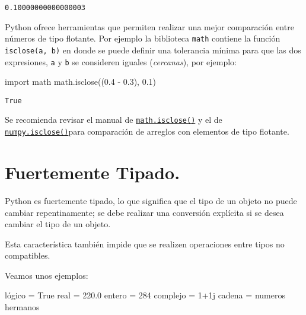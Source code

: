 \documentclass[
  letterpaper,
  DIV=11,
  numbers=noendperiod]{scrreprt}
\newenvironment{Shaded}{\begin{snugshade}}{\end{snugshade}}
\newcommand{\DecValTok}[1]{\textcolor[rgb]{0.68,0.00,0.00}{#1}}
\newcommand{\FloatTok}[1]{\textcolor[rgb]{0.68,0.00,0.00}{#1}}
\newcommand{\ImportTok}[1]{\textcolor[rgb]{0.00,0.46,0.62}{#1}}
\newcommand{\NormalTok}[1]{\textcolor[rgb]{0.00,0.23,0.31}{#1}}
\newcommand{\OperatorTok}[1]{\textcolor[rgb]{0.37,0.37,0.37}{#1}}
\newcommand{\OtherTok}[1]{\textcolor[rgb]{0.00,0.23,0.31}{#1}}
\newcommand{\StringTok}[1]{\textcolor[rgb]{0.13,0.47,0.30}{#1}}
\newcommand{\VariableTok}[1]{\textcolor[rgb]{0.07,0.07,0.07}{#1}}
\begin{document}
\begin{verbatim}
0.10000000000000003
\end{verbatim}

Python ofrece herramientas que permiten realizar una mejor comparación
entre números de tipo flotante. Por ejemplo la biblioteca \texttt{math}
contiene la función \texttt{isclose(a,\ b)} en donde se puede definir
una tolerancia mínima para que las dos expresiones, \texttt{a} y
\texttt{b} se consideren iguales (\emph{cercanas}), por ejemplo:

\begin{Shaded}
\begin{Highlighting}[]
\ImportTok{import}\NormalTok{ math}
\NormalTok{math.isclose((}\FloatTok{0.4} \OperatorTok{{-}} \FloatTok{0.3}\NormalTok{), }\FloatTok{0.1}\NormalTok{)}
\end{Highlighting}
\end{Shaded}

\begin{verbatim}
True
\end{verbatim}

Se recomienda revisar el manual de
\href{https://docs.python.org/3/library/math.html}{\texttt{math.isclose()}}
y el de
\href{https://numpy.org/doc/stable/reference/generated/numpy.isclose.html}{\texttt{numpy.isclose()}}para
comparación de arreglos con elementos de tipo flotante.

\section{Fuertemente Tipado.}\label{fuertemente-tipado.}

Python es fuertemente tipado, lo que significa que el tipo de un objeto
no puede cambiar repentinamente; se debe realizar una conversión
explícita si se desea cambiar el tipo de un objeto.

Esta característica también impide que se realizen operaciones entre
tipos no compatibles.

Veamos unos ejemplos:

\begin{Shaded}
\begin{Highlighting}[]
\NormalTok{lógico }\OperatorTok{=} \VariableTok{True} 
\NormalTok{real   }\OperatorTok{=} \FloatTok{220.0}  
\NormalTok{entero }\OperatorTok{=} \DecValTok{284}
\NormalTok{complejo }\OperatorTok{=} \DecValTok{1}\OperatorTok{+}\OtherTok{1j}
\NormalTok{cadena }\OperatorTok{=} \StringTok{\textquotesingle{}numeros hermanos\textquotesingle{}}
\end{Highlighting}
\end{Shaded}
\end{document}
